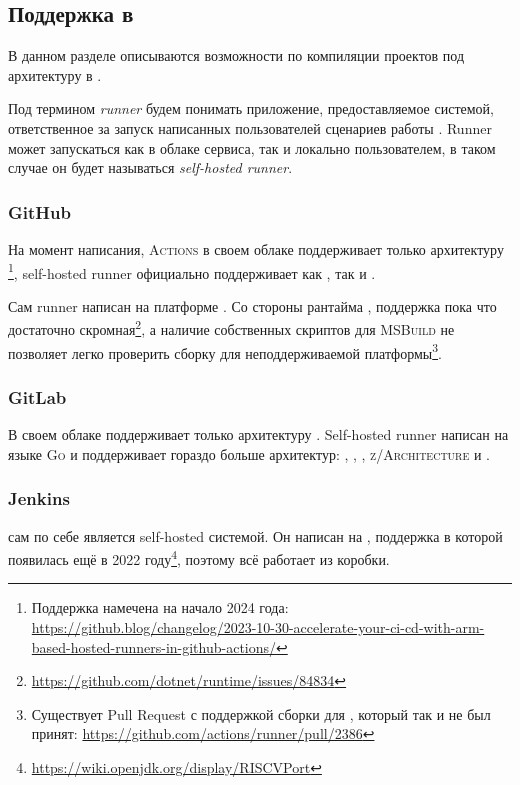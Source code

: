 \subsection{Поддержка в \ci{}}

В данном разделе описываются возможности по компиляции проектов под архитектуру \riscv{} в \ci{}.

\begin{definition}[Runner]
	Под термином \textit{runner} будем понимать приложение, предоставляемое \ci{} системой, ответственное за запуск написанных пользователей сценариев работы \ci{}.
	Runner может запускаться как в облаке \ci{} сервиса, так и локально пользователем, в таком случае он будет называться \textit{self-hosted runner}.
\end{definition}

\subsubsection{GitHub}

На момент написания, \GitHub{} \textsc{Actions} в своем облаке поддерживает только архитектуру \amd{}\footnote{Поддержка \arm{} намечена на начало 2024 года: \url{https://github.blog/changelog/2023-10-30-accelerate-your-ci-cd-with-arm-based-hosted-runners-in-github-actions/}}, self-hosted runner официально поддерживает как \amd{}, так и \arm{}.

Сам runner написан на платформе \dotnet{}.
Со стороны рантайма \dotnet{}, поддержка \riscv{} пока что достаточно скромная\footnote{\url{https://github.com/dotnet/runtime/issues/84834}}, а наличие собственных скриптов для \textsc{MSBuild} не позволяет легко проверить сборку для неподдерживаемой платформы\footnote{Существует Pull Request с поддержкой сборки для \power{}, который так и не был принят: \url{https://github.com/actions/runner/pull/2386}}.

\subsubsection{GitLab}

В своем облаке \gitlab{} поддерживает только архитектуру \amd{}.
Self-hosted runner написан на языке \textsc{Go} и поддерживает гораздо больше архитектур: \amd{}, \arm{}, \power{}, \textsc{z/Architecture} и \riscv{}.

\subsubsection{Jenkins}

\jenkins{} сам по себе является self-hosted \ci{} системой.
Он написан на \java{}, поддержка \riscv{} в которой появилась ещё в 2022 году\footnote{\url{https://wiki.openjdk.org/display/RISCVPort}}, поэтому всё работает из коробки.
